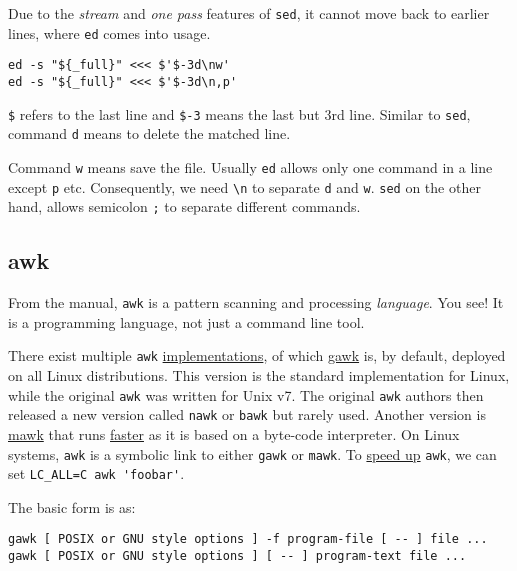 Due to the \textit{stream} and \textit{one pass} features of
\lstinline|sed|, it cannot move back to earlier lines, where
\lstinline|ed| comes into usage.

\begin{lstlisting}
ed -s "${_full}" <<< $'$-3d\nw'
ed -s "${_full}" <<< $'$-3d\n,p'
\end{lstlisting}

\verb|$| refers to the last line and \lstinline|$-3| means the
last but 3rd line. Similar to \lstinline|sed|, command \verb|d|
means to delete the matched line.

Command \verb|w| means save the file. Usually \lstinline|ed|
allows only one command in a line except \verb|p|
etc. Consequently, we need \verb|\n| to separate \verb|d| and
\verb|w|. \lstinline|sed| on the other hand, allows semicolon
\lstinline|;| to separate different commands.

\subsection{awk}
\label{sec:bash-awk}

From the manual, \lstinline|awk| is a pattern scanning and
processing \textit{language}. You see! It is a programming
language, not just a command line tool.

There exist multiple \verb|awk|
\href{https://superuser.com/questions/75875/awk-mawk-nawk-gawk-what}{implementations},
of which \href{https://www.gnu.org/software/gawk/gawk.html}{gawk}
is, by default, deployed on all Linux distributions. This version
is the standard implementation for Linux, while the original
\verb|awk| was written for Unix v7. The original \verb|awk|
authors then released a new version called \verb|nawk| or
\verb|bawk| but rarely used. Another version is
\href{https://invisible-island.net/mawk/mawk.html}{mawk} that runs
\href{https://brenocon.com/blog/2009/09/dont-mawk-awk-the-fastest-and-most-elegant-big-data-munging-language/}{faster}
as it is based on a byte-code interpreter. On Linux systems,
\verb|awk| is a symbolic link to either \verb|gawk| or
\verb|mawk|. To
\href{https://stackoverflow.com/questions/33426591/awk-vs-nawk-vs-mawk-processing-heavy-files}{speed
  up} \verb|awk|, we can set \verb|LC_ALL=C awk 'foobar'|.

The basic form is as:

\begin{lstlisting}
gawk [ POSIX or GNU style options ] -f program-file [ -- ] file ...
gawk [ POSIX or GNU style options ] [ -- ] program-text file ...
\end{lstlisting}

